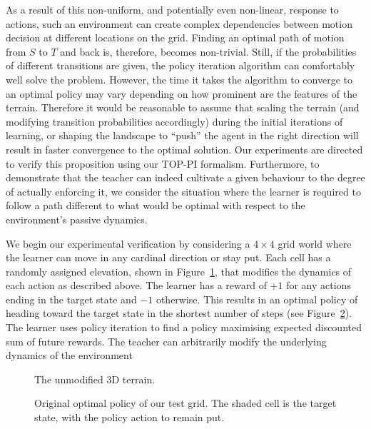 As a result of this non-uniform, and potentially even non-linear,
response to actions, such an environment can create complex
dependencies between motion decision at different locations on the
grid. Finding an optimal path of motion from $S$ to $T$ and back is,
therefore, becomes non-trivial. Still, if the probabilities of
different transitions are given, the policy iteration algorithm can
comfortably well solve the problem. However, the time it takes the
algorithm to converge to an optimal policy may vary depending on how
prominent are the features of the terrain. Therefore it would be
reasonable to assume that scaling the terrain (and modifying
transition probabilities accordingly) during the initial iterations of
learning, or shaping the landscape to ``push'' the agent in the right
direction will result in faster convergence to the optimal
solution. Our experiments are directed to verify this proposition
using our TOP-PI formalism.  Furthermore, to demonstrate that the
teacher can indeed cultivate a given behaviour to the degree of actually 
enforcing it, we consider the situation where the learner is required
to follow a path different to what would be optimal with respect to
the environment's passive dynamics. %

We begin our experimental verification by considering a $4 \times 4$
grid world where the learner can move in any cardinal direction or
stay put.  Each cell has a randomly assigned elevation, shown in
Figure~\ref{probalt}, that modifies the dynamics of each action as
described above.  The learner has a reward of $+1$ for any actions
ending in the target state and $-1$ otherwise.  This results in an
optimal policy of heading toward the target state in the shortest
number of steps (see Figure~\ref{prevopt}).  The learner uses policy
iteration to find a policy maximising expected discounted sum of
future rewards. The teacher can arbitrarily modify the underlying
dynamics of the environment

\begin{figure}[ht]
\centerline{}
\caption{\label{probalt}The unmodified 3D terrain.}
\end{figure}

\begin{figure}[ht]
\centerline{}
\caption{\label{prevopt}Original optimal policy of our test grid.  The shaded cell is the target state, with the policy action to remain put.}
\end{figure}

